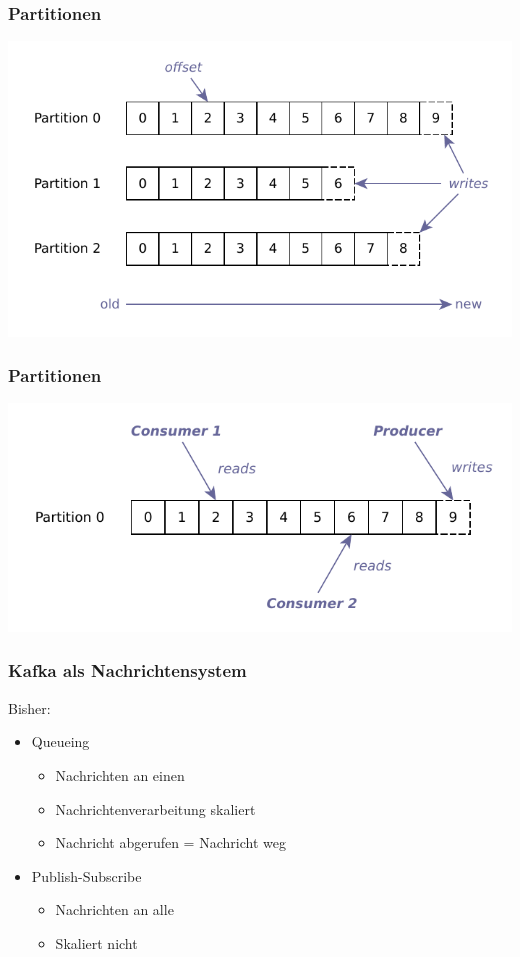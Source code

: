 \begin{frame}
\frametitle{Partitionen}
	\centering
	\includegraphics[scale=0.75]{figure/partitioned_log.pdf}
\end{frame}

\begin{frame}
\frametitle{Partitionen}
\centering
\includegraphics[scale=0.75]{figure/partition.pdf}
\end{frame}

\begin{frame}
\frametitle{Kafka als Nachrichtensystem}

Bisher: 
\begin{itemize}
	\item Queueing
	\begin{itemize}
		\item Nachrichten an einen
		\item Nachrichtenverarbeitung skaliert
		\item Nachricht abgerufen = Nachricht weg
	\end{itemize}
	\item Publish-Subscribe
	\begin{itemize}
		\item Nachrichten an alle
		\item Skaliert nicht  			%
	\end{itemize}
\end{itemize}

\end{frame}

